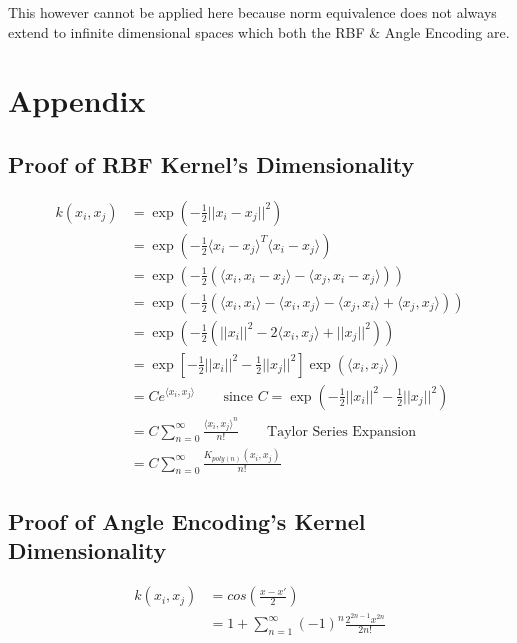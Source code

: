\documentclass[hidelinks]{book}
\numberwithin{equation}{section}
\begin{document}
This however cannot be applied here because norm equivalence does not always extend to
infinite dimensional spaces which both the RBF & Angle Encoding are.

\section{Appendix}
\subsection{Proof of RBF Kernel's Dimensionality}

\begin{equation}
\begin{split}
k(x_i, x_j) & = \exp(-\frac{1}{2} ||x_i - x_j||^2) \\
  & = \exp(-\frac{1}{2} \langle x_i - x_j\rangle^T \langle x_i - x_j\rangle) \\
  & = \exp(-\frac{1}{2} (\langle x_i, x_i - x_j\rangle - \langle x_j, x_i - x_j\rangle)) \\
  & = \exp(-\frac{1}{2} (\langle x_i, x_i\rangle - \langle x_i, x_j\rangle - \langle x_j, x_i\rangle + \langle x_j, x_j\rangle)) \\
  & = \exp(-\frac{1}{2} (||x_i||^2 - 2\langle x_i, x_j\rangle + ||x_j||^2)) \\
  & = \exp[-\frac{1}{2} ||x_i||^2 - \frac{1}{2} ||x_j||^2] \exp(\langle x_i, x_j\rangle) \\
  & = C e^{\langle x_i, x_j\rangle} \quad \quad \text{since } C = \exp(-\frac{1}{2} ||x_i||^2 - \frac{1}{2} ||x_j||^2) \\
  & = C \sum_{n=0}^{\infty} \frac{\langle x_i, x_j\rangle^n}{n!} \quad \quad \text{Taylor Series Expansion} \\
  & = C \sum_{n=0}^{\infty} \frac{K_{poly(n)}(x_i, x_j) }{n!}
\end{split}
\end{equation}

\subsection{Proof of Angle Encoding's Kernel Dimensionality}

\begin{equation}
\begin{split}
k(x_i, x_j) & = cos(\frac{x-x'}{2}) \\
& = 1+ \sum_{n=1}^\infty (-1)^n \frac{2^{2n-1}x^{2n}}{2n!}
\end{split}
\end{equation}
\end{document}
